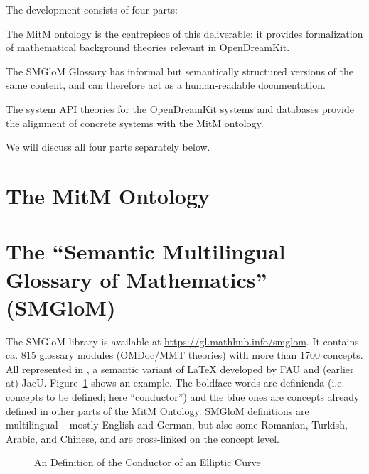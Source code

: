 \documentclass[book]{deliverablereport}
\begin{document}
The development consists of four parts:
\begin{compactenum}[\em i\rm)]
\item The MitM ontology is the centrepiece of this deliverable: it provides formalization of mathematical background theories relevant in OpenDreamKit.
\item The SMGloM Glossary has informal but semantically structured versions of the same content, and can therefore act as a human-readable documentation.
\item The system API theories for the OpenDreamKit systems and databases provide the alignment of concrete systems with the MitM ontology.
\end{compactenum}
We will discuss all four parts separately below.

\section{The MitM Ontology}



\section{The ``Semantic Multilingual Glossary of Mathematics'' (SMGloM)}\label{sec:smglom}

The SMGloM library is available at \url{https://gl.mathhub.info/smglom}. It contains
ca. 815 glossary modules (OMDoc/MMT theories) with more than 1700 concepts. All
represented in \sTeX, a semantic variant of {\LaTeX} developed by FAU and (earlier at)
JacU. Figure~\ref{fig:conductor} shows an example. The boldface words are definienda
(i.e. concepts to be defined; here ``conductor'') and the blue ones are concepts already
defined in other parts of the MitM Ontology. SMGloM definitions are multilingual -- mostly
English and German, but also some Romanian, Turkish, Arabic, and Chinese, and are
cross-linked on the concept level.

\begin{figure}[ht]\centering
  \caption{An \sTeX Definition of the Conductor of an Elliptic
    Curve}\label{fig:conductor}
\end{figure}
\end{document}
